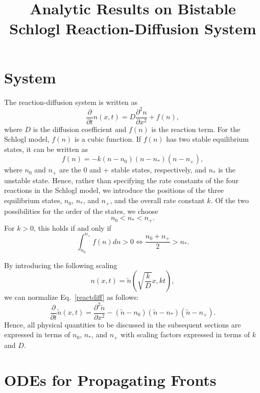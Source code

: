 \documentclass{article}
\begin{document}
\title{Analytic Results on Bistable Schlogl Reaction-Diffusion System}
\author{}
\date{}
\maketitle

\section{System}
The reaction-diffusion system is written as
\begin{equation}
\label{reactdiff}
\frac{\partial}{\partial t}n(x,t)=D\frac{\partial^2 n}{\partial x^2}+f(n),
\end{equation}
where $D$ is the diffusion coefficient and $f(n)$ is the reaction term.
For the Schlogl model, $f(n)$ is a cubic function.
If $f(n)$ has two stable equilibrium states, it can be written as
\begin{equation}
f(n)=-k(n-n_0)(n-n_*)(n-n_+),
\end{equation}
where $n_0$ and $n_+$ are the 0 and + stable states, respectively, and $n_*$ is the unstable state.
Hence, rather than specifying the rate constants of the four reactions in the Schlogl model, we introduce the positions of the three equilibrium states, $n_0$, $n_*$, and $n_+$, and the overall rate constant $k$.
Of the two possibilities for the order of the states, we choose
\begin{equation}
n_0<n_*<n_+.
\end{equation}
For $k>0$, this holds if and only if
\begin{equation}
\int_{n_0}^{n_+} f(n)dn>0 \iff \frac{n_0+n_+}{2}>n_*.
\end{equation}

By introducing the following scaling
\begin{equation}
n(x,t)=\tilde{n}\left(\sqrt{\frac{k}{D}}x,kt\right),
\end{equation}
we can normalize Eq.~\eqref{reactdiff} as follows:
\begin{equation}
\frac{\partial}{\partial t}\tilde{n}(x,t)
=\frac{\partial^2\tilde{n}}{\partial x^2}
-(\tilde{n}-n_0)(\tilde{n}-n_*)(\tilde{n}-n_+).
\end{equation}
Hence, all physical quantities to be discussed in the subsequent sections are expressed in terms of $n_0$, $n_*$, and $n_+$ with scaling factors expressed in terms of $k$ and $D$.

\section{ODEs for Propagating Fronts}
\end{document}
